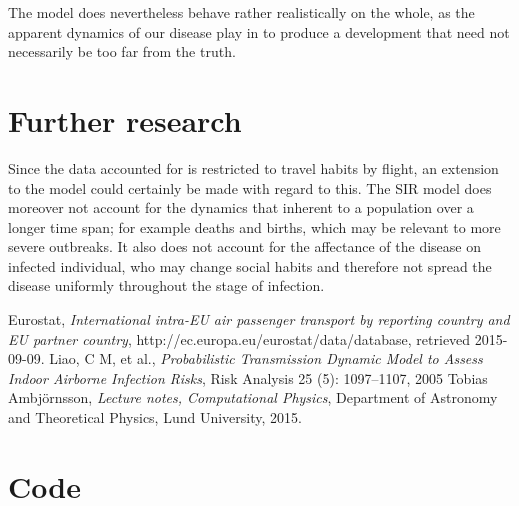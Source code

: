 \documentclass[a4paper,12pt]{article}
\theoremstyle{plain}
\theoremstyle{definition}
\begin{document}
   The model does nevertheless behave rather realistically on the whole, as the
   apparent dynamics of our disease play in to produce a development that need not
   necessarily be too far from the truth. 

\newpage
\section*{Further research}
  Since the data accounted for is restricted to travel habits by flight, an
  extension to the model could certainly be made with regard to this. The SIR
  model does moreover not account for the dynamics that inherent to a population
  over a longer time span; for example deaths and births, which may be relevant
  to more severe outbreaks. It also does not account for the
  affectance of the disease on infected individual, who may change social habits
  and therefore not spread the disease uniformly throughout the stage of infection.

\begin{thebibliography}{99}
     Eurostat, 
     \emph{International intra-EU air passenger transport by reporting country and EU
     partner country},
     http://ec.europa.eu/eurostat/data/database, 
     retrieved 2015-09-09.
     Liao, C M, et al.,
     \emph{Probabilistic Transmission Dynamic Model to Assess Indoor Airborne Infection
     Risks},
     Risk Analysis 25 (5): 1097–1107, 
     2005
     Tobias Ambjörnsson,
     \emph{Lecture notes, Computational Physics},
     Department of Astronomy and Theoretical Physics,
     Lund University,
     2015.
\end{thebibliography}
\newpage
\appendix
\section*{Code}
      
      
      
      
      
\end{document}
